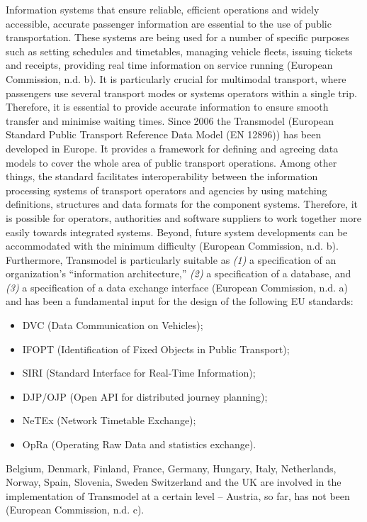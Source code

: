 \documentclass[
]{book}
\providecommand{\tightlist}{%
  \setlength{\itemsep}{0pt}\setlength{\parskip}{0pt}}
\begin{document}
Information systems that ensure reliable, efficient operations and widely accessible, accurate passenger information are essential to the use of public transportation. These systems are being used for a number of specific purposes such as setting schedules and timetables, managing vehicle fleets, issuing tickets and receipts, providing real time information on service running (European Commission, n.d. b). It is particularly crucial for multimodal transport, where passengers use several transport modes or systems operators within a single trip. Therefore, it is essential to provide accurate information to ensure smooth transfer and minimise waiting times.
Since 2006 the Transmodel (European Standard Public Transport Reference Data Model (EN 12896)) has been developed in Europe. It provides a framework for defining and agreeing data models to cover the whole area of public transport operations. Among other things, the standard facilitates interoperability between the information processing systems of transport operators and agencies by using matching definitions, structures and data formats for the component systems. Therefore, it is possible for operators, authorities and software suppliers to work together more easily towards integrated systems. Beyond, future system developments can be accommodated with the minimum difficulty (European Commission, n.d. b). Furthermore, Transmodel is particularly suitable as \emph{(1)} a specification of an organization's ``information architecture,'' \emph{(2)} a specification of a database, and \emph{(3)} a specification of a data exchange interface (European Commission, n.d. a) and has been a fundamental input for the design of the following EU standards:

\begin{itemize}
\tightlist
\item
  DVC (Data Communication on Vehicles);
\item
  IFOPT (Identification of Fixed Objects in Public Transport);
\item
  SIRI (Standard Interface for Real-Time Information);
\item
  DJP/OJP (Open API for distributed journey planning);
\item
  NeTEx (Network Timetable Exchange);
\item
  OpRa (Operating Raw Data and statistics exchange).
\end{itemize}

Belgium, Denmark, Finland, France, Germany, Hungary, Italy, Netherlands, Norway, Spain, Slovenia, Sweden Switzerland and the UK are involved in the implementation of Transmodel at a certain level -- Austria, so far, has not been (European Commission, n.d. c).
\end{document}

